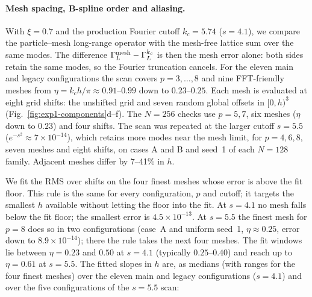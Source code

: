 \paragraph{Mesh spacing, B-spline order and aliasing.}
With $\xi=0.7$ and the production Fourier cutoff $k_c=5.74$ ($s=4.1$), we compare the particle--mesh long-range
operator with the mesh-free lattice sum over the same modes. The difference $\Gamma_L^{\rm mesh}-\Gamma_L^{k_c}$ is then
the mesh error alone: both sides retain the same modes, so the Fourier truncation cancels. For the eleven main and legacy configurations the scan covers $p=3,\dots,8$
and nine FFT-friendly meshes from $\eta=k_ch/\pi\approx0.91$--$0.99$ down to $0.23$--$0.25$. Each mesh is evaluated at
eight grid shifts: the unshifted grid and seven random global offsets in $[0,h)^3$ (Fig.~\ref{fig:exp1-components}d--f).
The $N=256$ checks use $p=5,7$, six meshes ($\eta$ down to $0.23$) and four shifts. The scan was repeated at the larger
cutoff $s=5.5$ ($e^{-s^2}\approx7\times10^{-14}$), which retains more modes near the mesh limit, for $p=4,6,8$, seven meshes and eight shifts, on cases A and B and
seed~1 of each $N=128$ family. Adjacent meshes differ by 7--41\% in $h$.

We fit the RMS over shifts on the four finest meshes whose error is above the fit floor. This rule is the same for
every configuration, $p$ and cutoff; it targets the smallest $h$ available without letting the floor into the fit.
At $s=4.1$ no mesh falls below the fit floor; the smallest error is $4.5\times10^{-13}$. At $s=5.5$ the finest
mesh for $p=8$ does so in two configurations (case~A and uniform seed~1, $\eta\approx0.25$, error down to
$8.9\times10^{-14}$); there the rule takes the next four meshes. The fit windows lie between $\eta=0.23$ and $0.50$ at $s=4.1$ (typically
$0.25$--$0.40$) and reach up to $\eta=0.61$ at $s=5.5$. The fitted slopes in $h$ are, as medians (with ranges for the four finest meshes) over
the eleven main and legacy configurations ($s=4.1$) and over the five configurations of the $s=5.5$ scan:

\begin{center}\small

\end{center}

